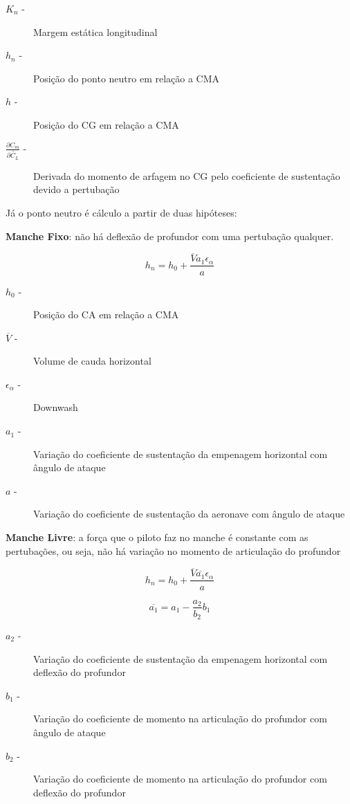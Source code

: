 \begin{description}
\item[$K_n$  -] Margem estática longitudinal
\item[$h_n$ -] Posição do ponto neutro em relação a CMA
\item[$h$ -] Posição do CG em relação a CMA
\item[$\frac{\partial C_m}{\partial \widetilde{C_L}}$ -] Derivada do momento de arfagem no CG pelo coeficiente de sustentação devido a pertubação
\end{description}

Já o ponto neutro é cálculo a partir de duas hipóteses:


\textbf{Manche Fixo}: não há deflexão de profundor com uma pertubação qualquer.

\begin{equation}
h_n = h_0 + \frac{\overline{V} a_1 \epsilon_{\alpha}}{a}
\end{equation}

\begin{description}
\item[$h_0$  -] Posição do CA em relação a CMA
\item[$\overline{V}$ -] Volume de cauda horizontal
\item[$\epsilon_{\alpha}$ -] Downwash
\item[$a_1$ -] Variação do coeficiente de sustentação da empenagem horizontal com ângulo de ataque
\item[$a$ -] Variação do coeficiente de sustentação da aeronave com ângulo de ataque
\end{description}

\textbf{Manche Livre}: a força que o piloto faz no manche é constante com as pertubações, ou seja, não há variação no momento de articulação do profundor

\begin{equation}
h_n = h_0 + \frac{ \overline{V} \overline{a_1} \epsilon_{\alpha} }{a}
\end{equation}

\begin{equation}
\overline{a_1} =  a_1 - \frac{a_2}{b_2} b_1
\end{equation}

\begin{description}
\item[$a_2$ -] Variação do coeficiente de sustentação da empenagem horizontal com deflexão do profundor
\item[$b_1$ -] Variação do coeficiente de momento na articulação do profundor com ângulo de ataque
\item[$b_2$ -] Variação do coeficiente de momento na articulação do profundor com deflexão do profundor
\end{description}

